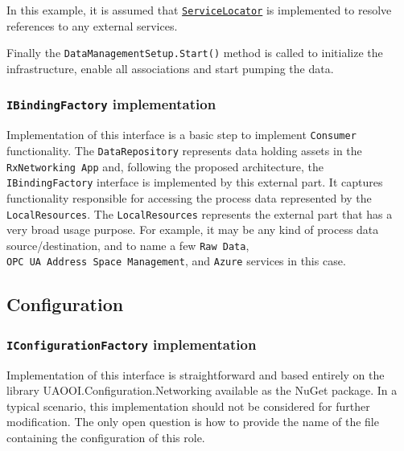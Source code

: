 \documentclass[
]{article}
\begin{document}
In this example, it is assumed that \href{https://www.nuget.org/packages/CommonServiceLocator}{\texttt{ServiceLocator}} is implemented to resolve references to any external services.

Finally the \texttt{DataManagementSetup.Start()} method is called to initialize the infrastructure, enable all associations and start pumping the data.

\hypertarget{ibindingfactory-implementation}{%
\subsubsection{\texorpdfstring{\texttt{IBindingFactory} implementation}{IBindingFactory implementation}}\label{ibindingfactory-implementation}}

Implementation of this interface is a basic step to implement \texttt{Consumer} functionality. The \texttt{DataRepository} represents data holding assets in the \texttt{RxNetworking\ App} and, following the proposed architecture, the \texttt{IBindingFactory} interface is implemented by this external part. It captures functionality responsible for accessing the process data represented by the \texttt{LocalResources}. The \texttt{LocalResources} represents the external part that has a very broad usage purpose. For example, it may be any kind of process data source/destination, and to name a few \texttt{Raw\ Data}, \texttt{OPC\ UA\ Address\ Space\ Management}, and \texttt{Azure} services in this case.

\hypertarget{configuration}{%
\subsection{Configuration}\label{configuration}}

\hypertarget{iconfigurationfactory-implementation}{%
\subsubsection{\texorpdfstring{\texttt{IConfigurationFactory} implementation}{IConfigurationFactory implementation}}\label{iconfigurationfactory-implementation}}

Implementation of this interface is straightforward and based entirely on the library UAOOI.Configuration.Networking available as the NuGet package. In a typical scenario, this implementation should not be considered for further modification. The only open question is how to provide the name of the file containing the configuration of this role.
\end{document}
